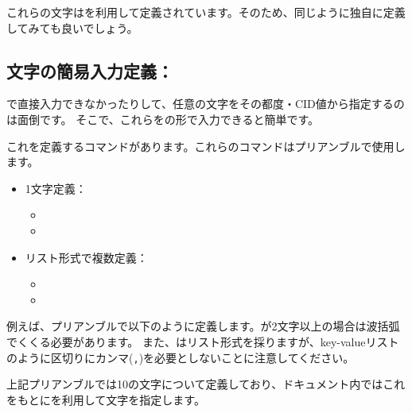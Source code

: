 \documentclass[uplatex, dvipdfmx, paper=a4paper, line_length=45zw, head_space=7zw, foot_space=10zw]{jlreq}
\begin{document}
これらの文字はを利用して定義されています。そのため、同じように独自に定義してみても良いでしょう。

\subsection{文字の簡易入力定義：\texorpdfstring{}{\textbackslash ajVar}}

{\ShiftJIS}で直接入力できなかったりして、任意の文字をその都度{\Unicode}・CID値から指定するのは面倒です。
そこで、これらをの形で入力できると簡単です。

これを定義するコマンドがあります。これらのコマンドはプリアンブルで使用します。

\begin{itemize}
  \item 1文字定義：
  \begin{itemize}
    \item {}
    \item {}
  \end{itemize}
  \item リスト形式で複数定義：
  \begin{itemize}
    \item {}
      \item {}
  \end{itemize}
\end{itemize}

例えば、プリアンブルで以下のように定義します。が2文字以上の場合は波括弧でくくる必要があります。
また、はリスト形式を採りますが、key-valueリストのように区切りにカンマ(\texttt{,})を必要としないことに注意してください。

\begin{texsource}
\end{texsource}

上記プリアンブルでは10の文字について定義しており、ドキュメント内ではこれをもとにを利用して文字を指定します。
\end{document}
